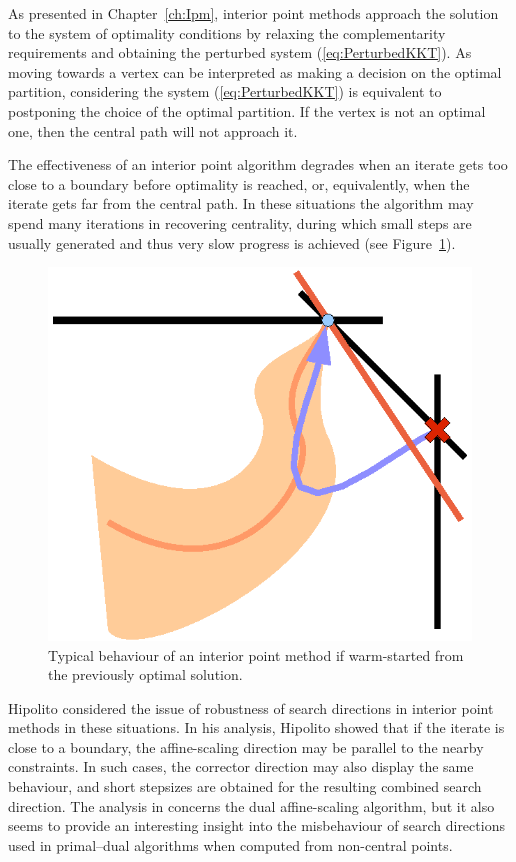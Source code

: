 As presented in Chapter~\ref{ch:Ipm}, interior point methods approach 
the solution to the \KKT system of optimality conditions by relaxing 
the complementarity requirements and obtaining the perturbed
system (\ref{eq:PerturbedKKT}).
As moving towards a vertex can be interpreted as making 
a decision on the optimal partition, considering the 
system (\ref{eq:PerturbedKKT}) is equivalent to postponing 
the choice of the optimal partition.
If the vertex is not an 
optimal one, then the central path will not approach it.

The effectiveness of an interior point algorithm degrades when an 
iterate gets too close to a boundary before optimality is reached,
or, equivalently, when the iterate gets far from the central path.
In these situations the algorithm may spend many iterations in recovering
centrality, during which small steps are usually generated and thus
very slow progress is achieved (see Figure~\ref{fig:ws-behaviour}).

\begin{figure}[ht]
\centering
\includegraphics[scale=0.75]{figures/ws-behaviour.eps}
\caption{Typical behaviour of an interior point method if warm-started
         from the previously optimal solution.}
\label{fig:ws-behaviour}
\end{figure}

Hipolito \cite{Hipolito} considered the issue of robustness of 
search directions in interior point methods in these situations.
In his analysis, Hipolito showed that if the iterate is close 
to a boundary, the affine-scaling direction may be parallel to 
the nearby constraints. In such cases, the corrector direction 
may also display the same behaviour, and short stepsizes are 
obtained for the resulting combined search direction.
The analysis in \cite{Hipolito} concerns the
dual affine-scaling algorithm, but
it also seems to provide an interesting insight into the misbehaviour
of search directions used in primal--dual algorithms
when computed from non-central points.


